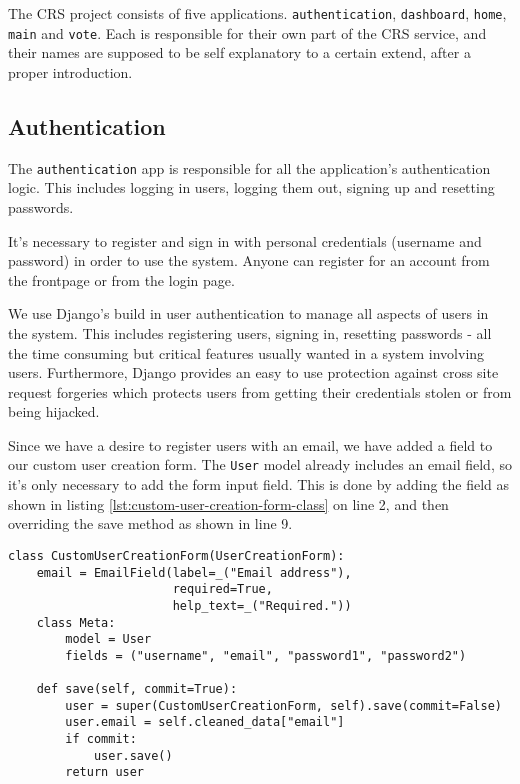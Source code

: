 The CRS project consists of five applications. \texttt{authentication}, \texttt{dashboard}, \texttt{home}, \texttt{main} and \texttt{vote}. Each is responsible for their own part of the CRS service, and their names are supposed to be self explanatory to a certain extend, after a proper introduction.

\subsection{Authentication}
The \texttt{authentication} app is responsible for all the application's authentication logic. This includes logging in users, logging them out, signing up and resetting passwords.

It's necessary to register and sign in with personal credentials (username and password) in order to use the system. Anyone can register for an account from the frontpage or from the login page.

We use Django's build in user authentication to manage all aspects of users in the system. This includes registering users, signing in, resetting passwords - all the time consuming but critical features usually wanted in a system involving users. Furthermore, Django provides an easy to use protection against cross site request forgeries which protects users from getting their credentials stolen or from being hijacked. 

Since we have a desire to register users with an email, we have added a field to our custom user creation form. The \texttt{User} model already includes an email field, so it's only necessary to add the form input field. This is done by adding the field as shown in listing \ref{lst:custom-user-creation-form-class} on line 2, and then overriding the save method as shown in line 9.


\begin{lstlisting}[caption=CustomUserCreationForm class, label=lst:custom-user-creation-form-class]
class CustomUserCreationForm(UserCreationForm):
    email = EmailField(label=_("Email address"), 
                       required=True, 
                       help_text=_("Required."))
    class Meta:
        model = User
        fields = ("username", "email", "password1", "password2")

    def save(self, commit=True):
        user = super(CustomUserCreationForm, self).save(commit=False)
        user.email = self.cleaned_data["email"]
        if commit:
            user.save()
        return user
\end{lstlisting}

